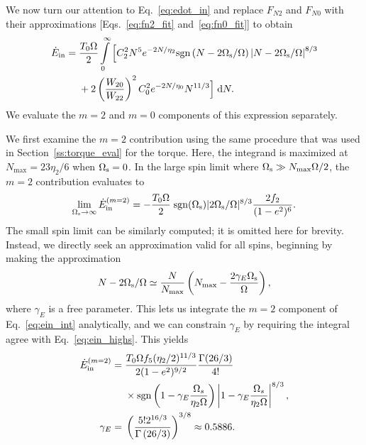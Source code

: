 \documentclass[
        fleqn,
        usenatbib,
    ]{mnras}
\newcommand*{\p}[1]{\left(#1\right)}
\begin{document}
We now turn our attention to Eq.~\eqref{eq:edot_in} and replace $F_{N2}$ and
$F_{N0}$ with their approximations [Eqs.~\eqref{eq:fn2_fit}
and~\eqref{eq:fn0_fit}] to obtain
\begin{align}
    \dot{E}_{\rm in} ={}&
        \frac{T_0 \Omega}{2} \int\limits_0^\infty \Big[
            C_2^2 N^5 e^{-2N/\eta_2} \mathrm{sgn}\left(N - 2\Omega_{\rm s} /
                \Omega\right) \left|N - 2 \Omega_{\rm s} /
                \Omega\right|^{8/3}\nonumber\\
            &+ 2 \p{\frac{W_{20}}{W_{22}}}^2 C_0^2 e^{-2N / \eta_0} N^{11/3}
        \Big]\;\mathrm{d}N.\label{eq:ein_int}
\end{align}
We evaluate the $m = 2$ and $m = 0$ components of this expression separately.

We first examine the $m = 2$ contribution using the same procedure that was used
in Section~\ref{ss:torque_eval} for the torque. Here, the integrand is maximized
at $N_{\max} = 23\eta_2 / 6$ when $\Omega_{\rm s} = 0$. In the large spin limit
where $\Omega_{\rm s} \gg N_{\max}\Omega / 2$, the $m = 2$ contribution
evaluates to
\begin{equation}
    \lim_{\Omega_{\rm s} \to \infty} \dot{E}_{\rm in}^{(m=2)} =
        -\frac{T_0\Omega}{2} \; \mathrm{sgn}(\Omega_{\rm s})|2\Omega_{\rm
        s}/\Omega|^{8/3} \frac{2f_2}{(1 - e^2)^6}.\label{eq:ein_highs}
\end{equation}
The small spin limit can be similarly computed; it is omitted here for brevity.
Instead, we directly seek an approximation valid for all spins, beginning by
making the approximation
\begin{equation}
    N - 2\Omega_{\rm s} / \Omega \simeq \frac{N}{N_{\max}}
        \left(N_{\max} - \frac{2\gamma_E
        \Omega_{\rm s}}{\Omega}\right)\label{eq:nmax_ansatz},
\end{equation}
where $\gamma_E$ is a free parameter. This lets us integrate the $m = 2$
component of Eq.~\eqref{eq:ein_int} analytically, and we can constrain
$\gamma_E$ by requiring the integral agree with Eq.~\eqref{eq:ein_highs}. This
yields
\begin{align}
    \dot{E}_{\rm in}^{(m=2)}
        ={}& \frac{T_0\Omega f_5 (\eta_2/2)^{11/3}}{2(1-e^2)^{9/2}}
            \frac{\Gamma(26/3)}{4!}\nonumber\\
        &\times \mathrm{sgn}\p{1 - \gamma_E\frac{\Omega_s}{\eta_2 \Omega}}
            \left|1 - \gamma_E\frac{\Omega_s}{\eta_2 \Omega}\right|^{8/3},\\
    \gamma_E ={}& \p{\frac{5! 2^{16/3}}{\Gamma\p{26/3}}}^{3/8}
        \approx 0.5886.
\end{align}
\end{document}
